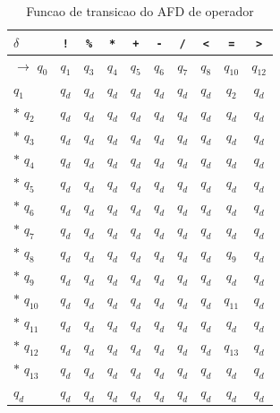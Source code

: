 \begin{table}[htb]
\centering
\caption{Funcao de transicao do AFD de operador}
\label{tab:afd-operador}
\begin{tabular}{l|ccccccccc}
\hline
$\delta$ & \texttt{!} & \texttt{\%} & \texttt{*} & \texttt{+} & \texttt{-} & \texttt{/} & \texttt{\textless{}} & \texttt{=} & \texttt{\textgreater{}} \\
\hline
$\rightarrow$ $q_{0}$ & $q_{1}$ & $q_{3}$ & $q_{4}$ & $q_{5}$ & $q_{6}$ & $q_{7}$ & $q_{8}$ & $q_{10}$ & $q_{12}$ \\
$q_{1}$ & $q_{d}$ & $q_{d}$ & $q_{d}$ & $q_{d}$ & $q_{d}$ & $q_{d}$ & $q_{d}$ & $q_{2}$ & $q_{d}$ \\
$*$ $q_{2}$ & $q_{d}$ & $q_{d}$ & $q_{d}$ & $q_{d}$ & $q_{d}$ & $q_{d}$ & $q_{d}$ & $q_{d}$ & $q_{d}$ \\
$*$ $q_{3}$ & $q_{d}$ & $q_{d}$ & $q_{d}$ & $q_{d}$ & $q_{d}$ & $q_{d}$ & $q_{d}$ & $q_{d}$ & $q_{d}$ \\
$*$ $q_{4}$ & $q_{d}$ & $q_{d}$ & $q_{d}$ & $q_{d}$ & $q_{d}$ & $q_{d}$ & $q_{d}$ & $q_{d}$ & $q_{d}$ \\
$*$ $q_{5}$ & $q_{d}$ & $q_{d}$ & $q_{d}$ & $q_{d}$ & $q_{d}$ & $q_{d}$ & $q_{d}$ & $q_{d}$ & $q_{d}$ \\
$*$ $q_{6}$ & $q_{d}$ & $q_{d}$ & $q_{d}$ & $q_{d}$ & $q_{d}$ & $q_{d}$ & $q_{d}$ & $q_{d}$ & $q_{d}$ \\
$*$ $q_{7}$ & $q_{d}$ & $q_{d}$ & $q_{d}$ & $q_{d}$ & $q_{d}$ & $q_{d}$ & $q_{d}$ & $q_{d}$ & $q_{d}$ \\
$*$ $q_{8}$ & $q_{d}$ & $q_{d}$ & $q_{d}$ & $q_{d}$ & $q_{d}$ & $q_{d}$ & $q_{d}$ & $q_{9}$ & $q_{d}$ \\
$*$ $q_{9}$ & $q_{d}$ & $q_{d}$ & $q_{d}$ & $q_{d}$ & $q_{d}$ & $q_{d}$ & $q_{d}$ & $q_{d}$ & $q_{d}$ \\
$*$ $q_{10}$ & $q_{d}$ & $q_{d}$ & $q_{d}$ & $q_{d}$ & $q_{d}$ & $q_{d}$ & $q_{d}$ & $q_{11}$ & $q_{d}$ \\
$*$ $q_{11}$ & $q_{d}$ & $q_{d}$ & $q_{d}$ & $q_{d}$ & $q_{d}$ & $q_{d}$ & $q_{d}$ & $q_{d}$ & $q_{d}$ \\
$*$ $q_{12}$ & $q_{d}$ & $q_{d}$ & $q_{d}$ & $q_{d}$ & $q_{d}$ & $q_{d}$ & $q_{d}$ & $q_{13}$ & $q_{d}$ \\
$*$ $q_{13}$ & $q_{d}$ & $q_{d}$ & $q_{d}$ & $q_{d}$ & $q_{d}$ & $q_{d}$ & $q_{d}$ & $q_{d}$ & $q_{d}$ \\
$q_{d}$ & $q_{d}$ & $q_{d}$ & $q_{d}$ & $q_{d}$ & $q_{d}$ & $q_{d}$ & $q_{d}$ & $q_{d}$ & $q_{d}$ \\
\hline
\end{tabular}
\end{table}

